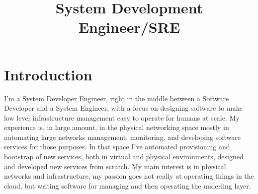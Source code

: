 \documentclass[11pt,a4paper,sans]{moderncv}        %
\title{System Development Engineer/SRE}                               %
\begin{document}
\makecvtitle

\section{Introduction}
I'm a System Developer Engineer, right in the middle between a Software Developer and a System Engineer, with a focus on designing software to make low level infrastructure management easy to operate for humans at scale.\newline{}
My experience is, in large amount, in the physical networking space mostly in automating large networks management, monitoring, and developing software services for those purposes.\newline{}
In that space I've automated provisioning and bootstrap of new services, both in virtual and physical environments, designed and developed new services from scratch.\newline{}
My main interest is in physical networks and infrastructure, my passion goes not really at operating things in the cloud, but writing software for managing and then operating the underling layer.
\end{document}
